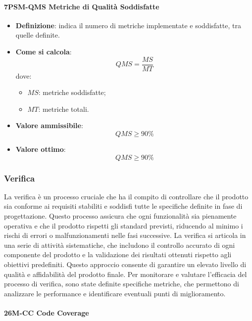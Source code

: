 \paragraph*{7PSM-QMS Metriche di Qualità Soddisfatte}
\begin{itemize}
	\item \textbf{Definizione}: indica il numero di metriche implementate e soddisfatte, tra quelle definite.
	\item \textbf{Come si calcola}: \begin{equation*}QMS = \frac{MS}{MT}\end{equation*} dove:
		\begin{itemize}
			\item $MS$: metriche soddisfatte;
			\item $MT$: metriche totali.
		\end{itemize}
	\item \textbf{Valore ammissibile}: \begin{equation*}QMS \geq 90\%\end{equation*}
	\item \textbf{Valore ottimo}: \begin{equation*}QMS \geq 90\%\end{equation*}
\end{itemize}




\subsubsection{Verifica}
La verifica è un processo cruciale che ha il compito di controllare che il prodotto sia conforme ai 
requisiti stabiliti e soddisfi tutte le specifiche definite in fase di progettazione. 
Questo processo assicura che ogni funzionalità sia pienamente operativa e che il prodotto rispetti 
gli standard previsti, riducendo al minimo i rischi di errori o malfunzionamenti nelle fasi successive.
La verifica si articola in una serie di attività sistematiche, che includono il controllo accurato di 
ogni componente del prodotto e la validazione dei risultati ottenuti rispetto agli obiettivi predefiniti. 
Questo approccio consente di garantire un elevato livello di qualità e affidabilità del prodotto finale.
Per monitorare e valutare l’efficacia del processo di verifica, sono state definite specifiche metriche, 
che permettono di analizzare le performance e identificare eventuali punti di miglioramento.

\paragraph*{26M-CC Code Coverage}









